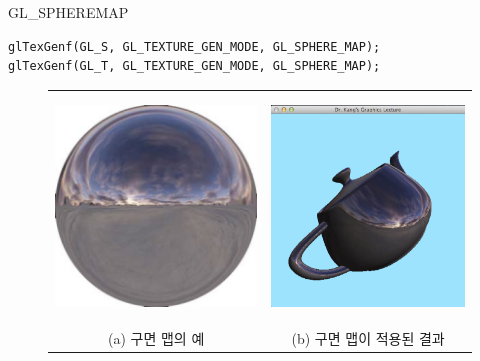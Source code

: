 \documentclass{beamer}
\begin{document}
\begin{frame}[fragile]{{\sf GL\_SPHEREMAP}}

\lstset{language=C++} 
\begin{lstlisting}
glTexGenf(GL_S, GL_TEXTURE_GEN_MODE, GL_SPHERE_MAP);
glTexGenf(GL_T, GL_TEXTURE_GEN_MODE, GL_SPHERE_MAP);
\end{lstlisting}

\begin{figure}[h!]
  \centering
	\begin{tabular}{cc}\\ \hline
	\includegraphics[height=6cm]{OGL_texture/sphereMap.png} &
	\includegraphics[height=6cm]{OGL_texture/sphereMapped.png} \\
	(a) 구면 맵의 예 & (b) 구면 맵이 적용된 결과
	\end{tabular}
\end{figure}

\end{frame}
\end{document}
